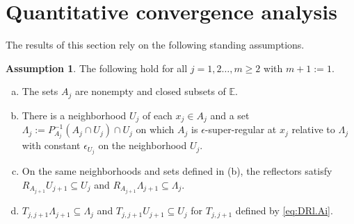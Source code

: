 \documentclass[12pt]{article}
\theoremstyle{definition}
\newtheorem{assumption}{Assumption}
\renewcommand{\equiv}{:=}
\newcommand{\Ebb}{\mathbb{E}}
\begin{document}
\section{Quantitative convergence analysis}\label{s:quant}

The results of this section rely on the following standing assumptions.
\begin{assumption}\label{a:1}  The following hold for all  $j=1,2\dots, m\geq 2$ with $m+1\equiv 1$.
\begin{enumerate}[(a)]
\item\label{a:1,a} The sets  $A_j$ are nonempty and closed subsets of $\Ebb$.
\item\label{a:1,b}  There is a neighborhood $U_j$ of each $x_j\in A_j$ and a set
$\Lambda_j:=P^{-1}_{A_j} (A_j\cap U_j)\cap U_j$ on which
$A_j$ is $\epsilon$-super-regular at $x_j$ relative to $\Lambda_j$ with constant $\epsilon_{U_j}$
    on the neighborhood $U_j$.
\item\label{a:1,c} On the same neighborhoods and sets defined in (b), the reflectors satisfy\\
$R_{A_{j+1}}U_{j+1}\subseteq U_{j}$ and $R_{A_{j+1}}\Lambda_{j+1}\subseteq \Lambda_{j}$.
\item\label{a:1,d}  $T_{j,j+1}\Lambda_{j+1}\subseteq \Lambda_{j}$ and
$T_{j,j+1}U_{j+1}\subseteq U_{j}$ for $T_{j,j+1}$ defined by \eqref{eq:DRl.Ai}.
\end{enumerate}
\end{assumption}
\end{document}
